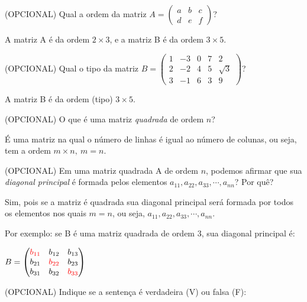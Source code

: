 \documentclass[pdftex, brazil, 12pt, oneside, addpoints]{exam}
\newcommand{\vf}[1][{}]{%
  \fillin[#1][0.25in]%
}
\begin{document}
\begin{questions}
\question
(OPCIONAL) Qual a ordem da matriz
$A = \begin{pmatrix}
a & b & c\\
d & e & f\end{pmatrix}$?
\begin{solution}
  A matriz A é da ordem $2 \times 3$, e a matriz B é da ordem $3 \times 5$.
\end{solution}

\question
(OPCIONAL) Qual o tipo da matriz
$B = \begin{pmatrix}
  1 & -3 & 0 & 7 & 2\\
  2 & -2 & 4 & 5 & \sqrt{3}\\
  3 & -1 & 6 & 3 & 9
\end{pmatrix}$?
\begin{solution}
  A matriz B é da ordem (tipo) $3 \times 5$.
\end{solution}

\question
(OPCIONAL) O que é uma matriz \emph{quadrada} de ordem $n$?
\begin{solution}
  É uma matriz na qual o número de linhas é igual ao número de colunas, ou seja,
  tem a ordem $m \times n,\ m = n$.
\end{solution}

\question
(OPCIONAL) Em uma matriz quadrada A de ordem $n$, podemos afirmar que sua \emph{diagonal
  principal} é formada pelos elementos $a_{11}, a_{22}, a_{33}, \cdots, a_{nn}$? Por quê?
\begin{solution}
  Sim, pois se a matriz é quadrada sua diagonal principal será formada por todos os
  elementos nos quais $m = n$, ou seja, $a_{11}, a_{22}, a_{33}, \cdots, a_{nn}$.

  Por exemplo: se B é uma matriz quadrada de ordem 3, sua diagonal principal é:

  $B = \begin{pmatrix}
   \color{red} b_{11} & b_{12} & b_{13}\\
   b_{21} & \color{red} b_{22} & b_{23}\\
   b_{31} & b_{32} & \color{red} b_{33}
  \end{pmatrix}$ 
\end{solution}

\question
(OPCIONAL) Indique se a sentença é verdadeira (V) ou falsa (F):
\end{questions}
\end{document}
